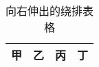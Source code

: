 \begin{wraptable}[4]{r}[1.5cm]{4.5cm}
  \centering
  \begin{tabular}{|c|c|c|c|}
    \hline 甲 & 乙 & 丙 & 丁 \\ \hline
  \end{tabular}
  \caption{向右伸出的绕排表格}\label{tag:wraptable}
\end{wraptable}
